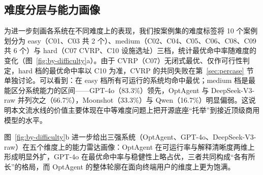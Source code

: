 \documentclass[11pt]{article}
\begin{document}
\subsection{难度分层与能力画像}
为进一步刻画各系统在不同难度上的表现，我们按案例集的难度标签将 10 个案例划分为 easy（C01、C03 共 2 个）、medium（C02、C04、C05、C06、C08、C09 共 6 个）与 hard（C07 CVRP、C10 设施选址）三档，统计最优命中率随难度的变化（图~\ref{fig:by-difficulty}a）。由于 CVRP（C07）无闭式最优、仅作可行性判定，hard 档的最优命中率以 C10 为准，CVRP 的共同失败在第~\ref{sec:percase} 节单独讨论。可以看到：在 easy 档所有可运行的系统均命中最优；medium 档是最能区分系统能力的区间——GPT-4o（83.3\%）领先，OptAgent 与 DeepSeek-V3-raw 并列次之（66.7\%），Moonshot（33.3\%）与 Qwen（16.7\%）明显偏弱。这说明本文流水线的价值主要体现在中等难度问题上把开源底座“托举”到接近顶级商用模型的水平。

图~\ref{fig:by-difficulty}b 进一步给出三强系统（OptAgent、GPT-4o、DeepSeek-V3-raw）在五个维度上的能力雷达画像：OptAgent 在可运行率与解释清晰度两维上形成明显外扩，GPT-4o 在最优命中率与稳健性上略占优，三者共同构成“各有所长”的格局，而 OptAgent 的整体轮廓在面向终端用户的维度上更为饱满。
\end{document}
